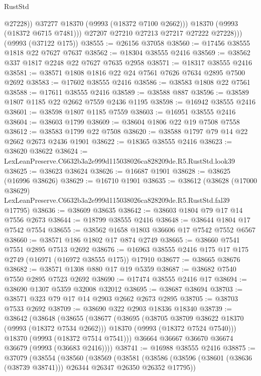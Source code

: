 \begin{lexlean}{RustStd}
\begin{coremodule}
                  @27228))
              @37277
              @18370
              (@9993 (@18372 @7100 @2662)))
            @18370
            (@9993 (@18372 @6715 @7481)))
          @27207
          @27210
          @27213
          @27217
          @27222
          @27228)))
    (@9993 (@37122 @175))
@38555 := @26156 @37058
@38560 := @17456 @38555 @1818 @22 @7627 @7637
@38562 := @18304 @38555 @2416
@38569 := @38562 @337 @1817 @2248 @22 @7627 @7635 @2958
@38571 := @18317 @38555 @2416
@38581 := @38571 @1808 @1816 @22 @24 @7561 @7626 @7634 @2895 @7500 @2692
@38583 := @17602 @38555 @2416
@38586 := @38583 @1808 @22 @7561
@38588 := @17611 @38555 @2416
@38589 := @38588 @887
@38596 := @38589 @1807 @1185 @22 @2662 @7559 @2436 @1195
@38598 := @16942 @38555 @2416
@38601 := @38598 @1807 @1185 @7559
@38603 := @16951 @38555 @2416
@38604 := @38603 @1799
@38609 := @38604 @1806 @22 @19 @7508 @7558
@38612 := @38583 @1799 @22 @7508
@38620 := @38588 @1797 @79 @14 @22 @2662 @2673 @2436 @1901
@38622 := @18365 @38555 @2416
@38623 := @38620 @38622
@38624 := LexLeanPreserve.C6632b3a2e999d115038026ca828209de.R5.RustStd.look39
@38625 := @38623 @38624
@38626 := @16687 @1901
@38628 := @38625 (@16996 @38626)
@38629 := @16710 @1901
@38635 := @38612
    (@38628
      (@17000 @38629)
      LexLeanPreserve.C6632b3a2e999d115038026ca828209de.R5.RustStd.fal39
      @17795)
@38636 := @38609 @38635
@38642 := @38603 @1804 @79 @17 @14 @7556 @2673
@38644 := @18799 @38555 @2416
@38648 := @38644 @1804 @17 @7542 @7554
@38655 := @38562 @1658 @1803 @36606 @17 @7542 @7552 @6567
@38660 := @38571 @186 @1802 @17 @874 @2749
@38665 := @38660 @7541 @7551 @2895 @7513 @2692
@38676 := @16963 @38555 @2416 @175 @17 @175 @2749 (@16971 (@16972 @38555 @175)) @17910
@38677 := @38665 @38676
@38682 := @38571 @1308 @880 @17 @19 @5359
@38687 := @38682 @7540 @7550 @2895 @7523 @2692
@38690 := @17474 @38555 @2416 @17
@38694 := @38690 @1307 @5359 @32008 @32012
@38695 := @38687 @38694
@38703 := @38571 @323 @79 @17 @14 @2903 @2662 @2673 @2895
@38705 := @38703 @7533 @2692
@38709 := @38690 @322 @2903 @18336 @18340
@38739 := @38642
    (@38648
      (@38655
        (@38677
          (@38695
            (@38705 @38709 @38622 @18370 (@9993 (@18372 @7534 @2662)))
            @18370
            (@9993 (@18372 @7524 @7540)))
          @18370
          (@9993 (@18372 @7514 @7541)))
        @36664
        @36667
        @36670
        @36674
        @36679
        (@9993 (@36683 @2416))))
@38741 := @16988 @38555 @2416
@38875 := @37079
    (@38554
      (@38560
        (@38569
          (@38581
            (@38586 (@38596 (@38601 (@38636 (@38739 @38741))) @26344 @26347 @26350 @26352 @17795))

\end{coremodule}
\end{lexlean}
